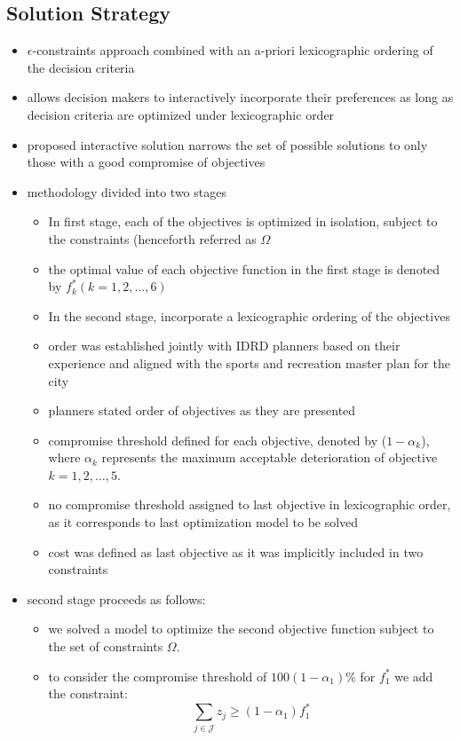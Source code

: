 \documentclass{article}
\begin{document}
\subsection{Solution Strategy}
\begin{itemize}
\item $\epsilon$-constraints approach combined with an a-priori lexicographic ordering of the decision criteria
\item allows decision makers to interactively incorporate their preferences as long as decision criteria are optimized under lexicographic order
\item proposed interactive solution narrows the set of possible solutions to only those with a good compromise of objectives
\item methodology divided into two stages
	\begin{itemize}
	\item In first stage, each of the objectives is optimized in isolation, subject to the constraints (henceforth referred as $\Omega$
	\item the optimal value of each objective function in the first stage is denoted by $f_k^* (k= 1,2, \dots, 6)$
	\item In the second stage, incorporate a lexicographic ordering of the objectives
	\item order was established jointly with IDRD planners based on their experience and aligned with the sports and recreation master plan for the city
	\item planners stated order of objectives as they are presented
	\item compromise threshold defined for each objective, denoted by ($1-\alpha_k$), where $\alpha_k$ represents the maximum acceptable deterioration of objective $k= 1, 2, \dots, 5$. 
	\item no compromise threshold assigned to last objective in lexicographic order, as it corresponds to last optimization model to be solved
	\item cost was defined as last objective as it was implicitly included in two constraints
	\end{itemize}
\item second stage proceeds as follows:
	\begin{itemize}
	\item we solved a model to optimize the second objective function subject to the set of constraints $\Omega$.
	\item to consider the compromise threshold of $100(1- \alpha_1)\%$ for $f_1^*$ we add the constraint: $$ \sum_{j \in \mathcal{J}} z_j \geq (1-\alpha_1)f_1^*$$

\end{itemize}
\end{itemize}
\end{document}
